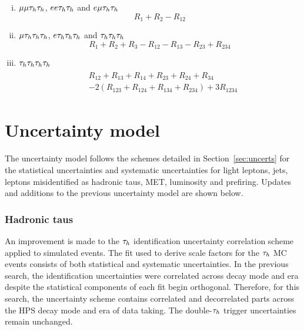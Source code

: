 \begin{enumerate}[i)]
\item $\mu\mu\tau_{h}\tau_{h}$, $ee\tau_{h}\tau_{h}$ and $e\mu\tau_{h}\tau_{h}$
\begin{equation}
R_1 + R_2 - R_{12}
\end{equation}

\item $\mu\tau_{h}\tau_{h}\tau_{h}$, $e\tau_{h}\tau_{h}\tau_{h}$ and $\tau_{h}\tau_{h}\tau_{h}$
\begin{equation}
R_1 + R_2 + R_3 - R_{12} - R_{13} - R_{23} + R_{234}
\end{equation}

\item $\tau_{h}\tau_{h}\tau_{h}\tau_{h}$
\begin{align}
\begin{split}
&R_{12} + R_{13} + R_{14} + R_{23} + R_{24} + R_{34} \\
&- 2(R_{123} + R_{124} + R_{134} + R_{234}) + 3R_{1234}
\end{split}
\end{align}
\end{enumerate}
 
\section{Uncertainty model}

The uncertainty model follows the schemes detailed in Section~\ref{sec:uncerts} for the statistical uncertainties and systematic uncertainties for light leptons, jets, leptons misidentified as hadronic taus, MET, luminosity and prefiring.
Updates and additions to the previous uncertainty model are shown below. \\

\subsubsection{Hadronic taus}
An improvement is made to the $\tau_{h}$ identification uncertainty correlation scheme applied to simulated events.
The fit used to derive scale factors for the $\tau_{h}$ \ac{MC} events consists of both statistical and systematic uncertainties.
In the previous search, the identification uncertainties were correlated across decay mode and era despite the statistical components of each fit begin orthogonal.
Therefore, for this search, the uncertainty scheme contains correlated and decorrelated parts across the \ac{HPS} decay mode and era of data taking.
The double-$\tau_{h}$ trigger uncertainties remain unchanged. \\

